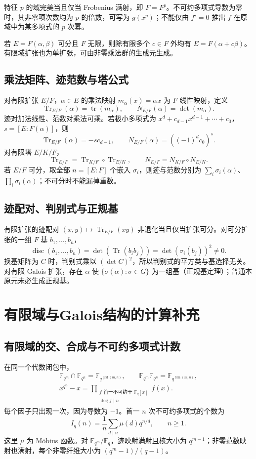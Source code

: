 \documentclass[../main.tex]{subfiles}
\begin{document}
特征 $p$ 的域完美当且仅当 Frobenius 满射，即 $F=F^p$。不可约多项式导数为零时，其非零项次数均为 $p$ 的倍数，可写为 $g(x^p)$；不能仅由 $f'=0$ 推出 $f$ 在原域中为某多项式的 $p$ 次幂。

若 $E=F(\alpha,\beta)$ 可分且 $F$ 无限，则除有限多个 $c\in F$ 外均有 $E=F(\alpha+c\beta)$。有限域扩张也为单扩张，可由非零乘法群的生成元生成。

\subsection{乘法矩阵、迹范数与塔公式}
对有限扩张 $E/F$，$\alpha\in E$ 的乘法映射 $m_\alpha(x)=\alpha x$ 为 $F$ 线性映射，定义
\[
\operatorname{Tr}_{E/F}(\alpha)=\operatorname{tr}(m_\alpha),\qquad
N_{E/F}(\alpha)=\det(m_\alpha).
\]
迹对加法线性、范数对乘法可乘。若极小多项式为 $x^d+c_{d-1}x^{d-1}+\cdots+c_0$，$s=[E:F(\alpha)]$，则
\[
\operatorname{Tr}_{E/F}(\alpha)=-s c_{d-1},\qquad
N_{E/F}(\alpha)=((-1)^dc_0)^s.
\]
对有限塔 $E/K/F$，
\[
\operatorname{Tr}_{E/F}=\operatorname{Tr}_{K/F}\circ\operatorname{Tr}_{E/K},\qquad
N_{E/F}=N_{K/F}\circ N_{E/K}.
\]
若 $E/F$ 可分，取全部 $n=[E:F]$ 个嵌入 $\sigma_i$，则迹与范数分别为 $\sum_i\sigma_i(\alpha)$、$\prod_i\sigma_i(\alpha)$；不可分时不能漏掉重数。

\subsection{迹配对、判别式与正规基}
有限扩张的迹配对 $(x,y)\mapsto\operatorname{Tr}_{E/F}(xy)$ 非退化当且仅当扩张可分。对可分扩张的一组 $F$ 基 $b_1,\ldots,b_n$，
\[
\operatorname{disc}(b_1,\ldots,b_n)
=\det(\operatorname{Tr}(b_ib_j))=\det(\sigma_i(b_j))^2\ne0.
\]
换基矩阵为 $C$ 时，判别式乘以 $(\det C)^2$，所以判别式的平方类与基选择无关。对有限 Galois 扩张，存在 $\alpha$ 使 $\{\sigma(\alpha):\sigma\in G\}$ 为一组基（正规基定理）；普通本原元未必生成正规基。

\section{有限域与Galois结构的计算补充}
\subsection{有限域的交、合成与不可约多项式计数}
在同一个代数闭包中，
\begin{gather*}
\mathbb F_{q^m}\cap\mathbb F_{q^n}=\mathbb F_{q^{\gcd(m,n)}},\qquad
\mathbb F_{q^m}\mathbb F_{q^n}=\mathbb F_{q^{\operatorname{lcm}(m,n)}},\\
x^{q^n}-x=\prod_{\substack{f\text{ 首一不可约于 }\mathbb F_q[x]\\\deg f\mid n}}f(x).
\end{gather*}
每个因子只出现一次，因为导数为 $-1$。首一 $n$ 次不可约多项式的个数为
\[
I_q(n)=\frac1n\sum_{d\mid n}\mu(d)q^{n/d},\qquad n\ge1.
\]
这里 $\mu$ 为 Möbius 函数。对 $\mathbb F_{q^m}/\mathbb F_q$，迹映射满射且核大小为 $q^{m-1}$；非零范数映射也满射，每个非零纤维大小为 $(q^m-1)/(q-1)$。
\end{document}
